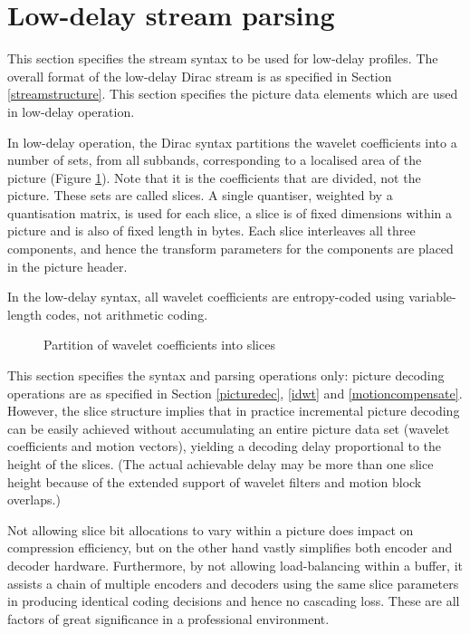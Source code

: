 \section{Low-delay stream parsing}
\label{lowdelayparsing}

This section specifies the stream syntax to be used for low-delay profiles.
The overall format of the low-delay Dirac stream is as specified in Section \ref{streamstructure}. This section
specifies the picture data elements which are used in low-delay operation. 

In low-delay operation, the Dirac syntax partitions the wavelet coefficients into a number of sets,
from all subbands, corresponding to a localised area of the picture (Figure \ref{fig:waveletslice}).
 Note that it is the coefficients that are divided,
not the picture. These sets are called slices. A single quantiser, weighted by a quantisation matrix, is used for each slice, 
a slice is  of fixed dimensions within a picture and is also of fixed length in bytes. Each slice interleaves all three components, and hence
the transform parameters for the components are placed in the picture header.

In the low-delay syntax, all wavelet coefficients are entropy-coded using variable-length
codes, not arithmetic coding.

\begin{figure}[!ht]
\centering
\caption{Partition of wavelet coefficients into slices}
\label{fig:waveletslice}
\end{figure}

This section specifies the syntax and parsing operations only: picture decoding operations are as
specified in Section \ref{picturedec}, \ref{idwt} and \ref{motioncompensate}. However, the slice
structure implies that in practice incremental picture decoding can be easily achieved without
accumulating an entire picture data set (wavelet coefficients and motion vectors), yielding a decoding delay
proportional to the height of the slices. (The actual achievable delay may be more than one slice height because
of the extended support of wavelet filters and motion block overlaps.)

\begin{informative}
Not allowing slice bit allocations to vary within a picture does impact on
compression efficiency, but on the other hand vastly simplifies both encoder and decoder hardware. Furthermore, by
not allowing load-balancing within a buffer, it assists a chain of multiple encoders and decoders using the same
slice parameters in producing identical coding decisions and hence no cascading loss. These are all factors of great 
significance in a professional environment.
\end{informative}

